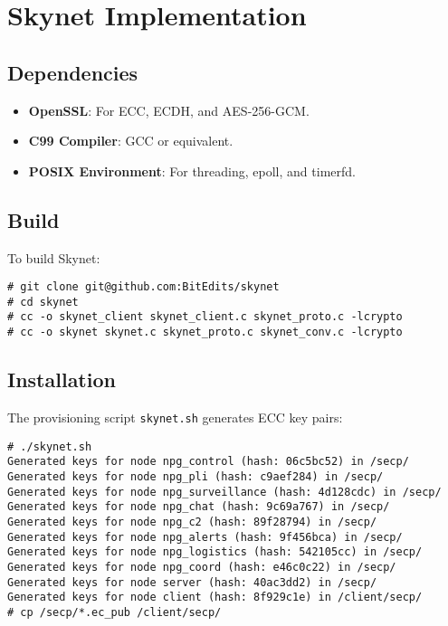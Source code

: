 \documentclass{article}
\begin{document}
\section{Skynet Implementation}

\subsection{Dependencies}
\begin{itemize}
    \item \textbf{OpenSSL}: For ECC, ECDH, and AES-256-GCM.
    \item \textbf{C99 Compiler}: GCC or equivalent.
    \item \textbf{POSIX Environment}: For threading, epoll, and timerfd.
\end{itemize}

\subsection{Build}
To build Skynet:
\begin{lstlisting}
# git clone git@github.com:BitEdits/skynet
# cd skynet
# cc -o skynet_client skynet_client.c skynet_proto.c -lcrypto
# cc -o skynet skynet.c skynet_proto.c skynet_conv.c -lcrypto
\end{lstlisting}

\newpage
\subsection{Installation}
The provisioning script \texttt{skynet.sh} generates ECC key pairs:
\begin{lstlisting}
# ./skynet.sh
Generated keys for node npg_control (hash: 06c5bc52) in /secp/
Generated keys for node npg_pli (hash: c9aef284) in /secp/
Generated keys for node npg_surveillance (hash: 4d128cdc) in /secp/
Generated keys for node npg_chat (hash: 9c69a767) in /secp/
Generated keys for node npg_c2 (hash: 89f28794) in /secp/
Generated keys for node npg_alerts (hash: 9f456bca) in /secp/
Generated keys for node npg_logistics (hash: 542105cc) in /secp/
Generated keys for node npg_coord (hash: e46c0c22) in /secp/
Generated keys for node server (hash: 40ac3dd2) in /secp/
Generated keys for node client (hash: 8f929c1e) in /client/secp/
# cp /secp/*.ec_pub /client/secp/
\end{lstlisting}
\end{document}
